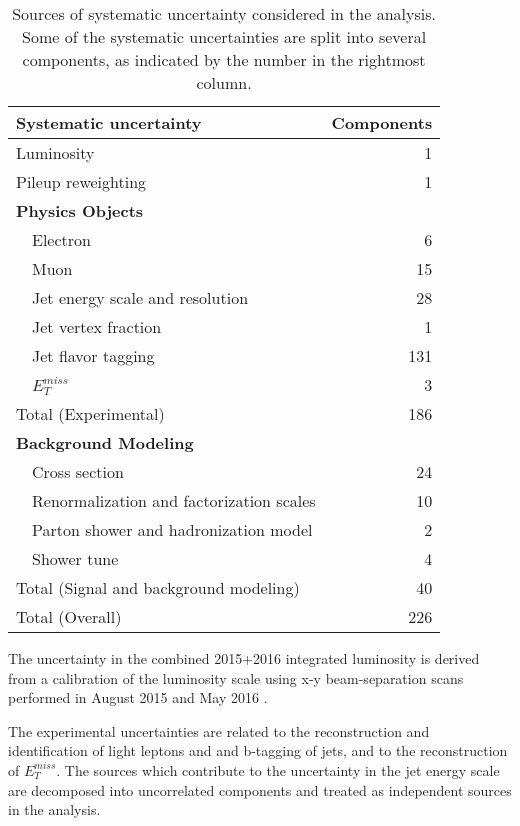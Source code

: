 \documentclass[NOTE, atlasdraft=true, texlive=2016, UKenglish]{\ATLASLATEXPATH atlasdoc}
\begin{document}
\begin{table}[h]
\centering
\caption{Sources of systematic uncertainty considered in the analysis.
Some of the systematic uncertainties are split into several components, as indicated by the number in the rightmost column.}
\begin{tabular}{lr}
\hline\hline
Systematic uncertainty & Components  	      \\
\hline
\hline
Luminosity	& 1		      \\
Pileup reweighting 	& 1		      \\
\textbf {Physics Objects}     	&		      \\
\ \ Electron                               	& 6		      \\
\ \ Muon	& 15		      \\
\ \ Jet energy scale and resolution  	& 28                  \\
\ \ Jet vertex fraction  	& 1		      \\
\ \ Jet flavor tagging   	& 131		      \\
\ \ $E^{miss}_T$  	& 3		      \\
\hline
Total (Experimental)        & 186		     \\
\hline
\hline
\textbf {Background Modeling}          	&		      \\
\ \ Cross section                 	& 24		      \\
\ \ Renormalization and factorization scales 	& 10		      \\
\ \ Parton shower and hadronization model       	& 2		      \\
\ \ Shower tune				& 4		      \\
\hline
Total (Signal and background modeling)       & 40		     \\
\hline\hline
Total (Overall)                             & 226	      \\
\hline\hline
\end{tabular}
\label{tab:SystSummary}
\end{table}

The uncertainty in the combined 2015+2016 integrated luminosity is derived from a calibration of the luminosity scale using x-y beam-separation scans performed in August 2015 and May 2016 \cite{lumi}.

The experimental uncertainties are related to the reconstruction and identification of light leptons and
 and b-tagging of jets, and to the reconstruction of $E^{miss}_T$. The sources which contribute to the uncertainty in the jet energy scale \cite{jes} are decomposed into uncorrelated components and treated as independent sources in the analysis. 
\end{document}

